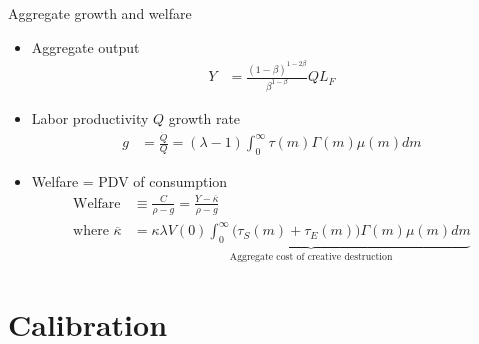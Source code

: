\documentclass[english,usenames,dvipsnames]{beamer}
\begin{document}
\begin{frame}{Aggregate growth and welfare}
\begin{itemize}
\item Aggregate output
\begin{align*}
	Y &= \frac{(1-\beta)^{1-2\beta}}{\beta^{1-\beta}} Q L_F \label{flow_output}
\end{align*}
\item Labor productivity $Q$ growth rate
\begin{align*}
g &= \frac{\dot{Q}}{Q} = (\lambda -1) \int_0^{\infty} \tau(m) \Gamma(m) \mu(m) dm
\end{align*}
\item Welfare = PDV of consumption
\begin{align*}
	\textrm{Welfare} &\equiv \frac{C}{\rho - g} = \frac{Y - \overline{\kappa}}{\rho - g} \\
	\textrm{where } \overline{\kappa} &= \underbrace{\kappa \lambda V(0) \int_0^{\infty} \big(\tau_S(m) + \tau_E(m)\big) \Gamma(m) \mu(m) dm}_{\textrm{Aggregate cost of creative destruction}}
\end{align*}
\end{itemize}
\end{frame}


\section{Calibration}


\begin{frame}
\tableofcontents[currentsection]
\end{frame}
\end{document}
